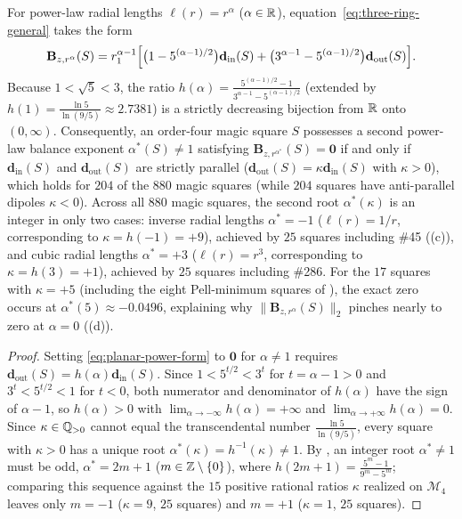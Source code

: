\begin{corollary}
\label{cor:planar-power-roots}
For power-law radial lengths $\ell(r)=r^\alpha$ ($\alpha\in\mathbb{R}$), equation~\eqref{eq:three-ring-general} takes the form
\begin{equation}
\label{eq:planar-power-form}
\mathbf B_{z,r^\alpha}(S) = r_1^{\alpha-1}\Bigl[\bigl(1 - 5^{(\alpha-1)/2}\bigr)\mathbf d_{\mathrm{in}}(S) + \bigl(3^{\alpha-1} - 5^{(\alpha-1)/2}\bigr)\mathbf d_{\mathrm{out}}(S)\Bigr].
\end{equation}
Because $1<\sqrt{5}<3$, the ratio $h(\alpha)=\frac{5^{(\alpha-1)/2}-1}{3^{\alpha-1}-5^{(\alpha-1)/2}}$ (extended by $h(1)=\frac{\ln 5}{\ln(9/5)}\approx2.7381$) is a strictly decreasing bijection from $\mathbb{R}$ onto $(0,\infty)$. Consequently, an order-four magic square $S$ possesses a second power-law balance exponent $\alpha^*(S)\ne1$ satisfying $\mathbf B_{z,r^{\alpha^*}}(S)=\mathbf 0$ if and only if $\mathbf d_{\mathrm{in}}(S)$ and $\mathbf d_{\mathrm{out}}(S)$ are strictly parallel ($\mathbf d_{\mathrm{out}}(S)=\kappa\mathbf d_{\mathrm{in}}(S)$ with $\kappa>0$), which holds for $204$ of the $880$ magic squares (while $204$ squares have anti-parallel dipoles $\kappa<0$). Across all $880$ magic squares, the second root $\alpha^*(\kappa)$ is an integer in only two cases: inverse radial lengths $\alpha^*=-1$ ($\ell(r)=1/r$, corresponding to $\kappa=h(-1)=+9$), achieved by $25$ squares including \#45 ((c)), and cubic radial lengths $\alpha^*=+3$ ($\ell(r)=r^3$, corresponding to $\kappa=h(3)=+1$), achieved by $25$ squares including \#286. For the $17$ squares with $\kappa=+5$ (including the eight Pell-minimum squares of ), the exact zero occurs at $\alpha^*(5)\approx -0.0496$, explaining why $\|\mathbf B_{z,r^\alpha}(S)\|_2$ pinches nearly to zero at $\alpha=0$ ((d)).
\end{corollary}

\begin{proof}
Setting \eqref{eq:planar-power-form} to $\mathbf 0$ for $\alpha\ne1$ requires $\mathbf d_{\mathrm{out}}(S)=h(\alpha)\mathbf d_{\mathrm{in}}(S)$. Since $1<5^{t/2}<3^t$ for $t=\alpha-1>0$ and $3^t<5^{t/2}<1$ for $t<0$, both numerator and denominator of $h(\alpha)$ have the sign of $\alpha-1$, so $h(\alpha)>0$ with $\lim_{\alpha\to-\infty}h(\alpha)=+\infty$ and $\lim_{\alpha\to+\infty}h(\alpha)=0$. Since $\kappa\in\mathbb{Q}_{>0}$ cannot equal the transcendental number $\frac{\ln 5}{\ln(9/5)}$, every square with $\kappa>0$ has a unique root $\alpha^*(\kappa)=h^{-1}(\kappa)\ne1$. By , an integer root $\alpha^*\ne1$ must be odd, $\alpha^*=2m+1$ ($m\in\mathbb{Z}\setminus\{0\}$), where $h(2m+1)=\frac{5^m-1}{9^m-5^m}$; comparing this sequence against the $15$ positive rational ratios $\kappa$ realized on $\mathcal M_4$ leaves only $m=-1$ ($\kappa=9$, $25$ squares) and $m=+1$ ($\kappa=1$, $25$ squares).
\end{proof}


